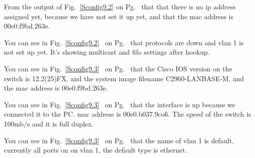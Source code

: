 \documentclass[../EngineeringJournal_CDavis.tex]{subfiles}
\begin{document}
From the output of Fig.~\ref{Sconfig9.2} on
Pg.~\pageref{Sconfig9.2} that that there is no ip address assigned yet, because
we have not set it up yet, and that the mac address is 00e0.f9bd.263e.
\hfill\break

You can see in Fig.~\ref{Sconfig9.2}~ 
on Pg.~\pageref{Sconfig9.2} that protocols are down and vlan 1 is not set up yet.
It's showing multicast and fifo settings after hookup.
\hfill\break

You can see in Fig.~\ref{Sconfig9.3}~ 
on Pg.~\pageref{Sconfig9.3} that the Cisco IOS version on the switch is
12.2(25)FX, and the system image filename C2960-LANBASE-M, and the mac address
is 00e0.f9bd.263e.
\hfill\break

You can see in Fig.~\ref{Sconfig9.3}~ 
on Pg.~\pageref{Sconfig9.3} that the interface is up because we connected it to
the PC. mac address is 00e0.b037.9co6. The speed of the switch is 100mb/s and
it is full duplex. 
\hfill\break

You can see in Fig.~\ref{Sconfig9.3}~ 
on Pg.~\pageref{Sconfig9.3} that the name of vlan 1 is default, currently all
ports on on vlan 1, the default type is ethernet.
\end{document}
